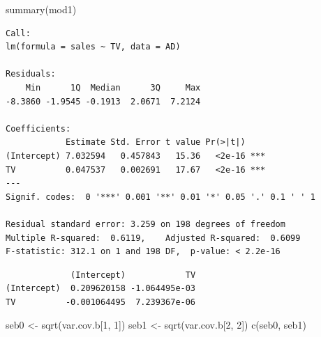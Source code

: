 \documentclass[
]{article}
\newenvironment{Shaded}{\begin{snugshade}}{\end{snugshade}}
\newcommand{\DecValTok}[1]{\textcolor[rgb]{0.00,0.00,0.81}{#1}}
\newcommand{\FunctionTok}[1]{\textcolor[rgb]{0.00,0.00,0.00}{#1}}
\newcommand{\NormalTok}[1]{#1}
\newcommand{\OtherTok}[1]{\textcolor[rgb]{0.56,0.35,0.01}{#1}}
\newcommand{\SpecialCharTok}[1]{\textcolor[rgb]{0.00,0.00,0.00}{#1}}
\begin{document}
\begin{Shaded}
\begin{Highlighting}[]
\FunctionTok{summary}\NormalTok{(mod1)}
\end{Highlighting}
\end{Shaded}

\begin{verbatim}
Call:
lm(formula = sales ~ TV, data = AD)

Residuals:
    Min      1Q  Median      3Q     Max 
-8.3860 -1.9545 -0.1913  2.0671  7.2124 

Coefficients:
            Estimate Std. Error t value Pr(>|t|)    
(Intercept) 7.032594   0.457843   15.36   <2e-16 ***
TV          0.047537   0.002691   17.67   <2e-16 ***
---
Signif. codes:  0 '***' 0.001 '**' 0.01 '*' 0.05 '.' 0.1 ' ' 1

Residual standard error: 3.259 on 198 degrees of freedom
Multiple R-squared:  0.6119,    Adjusted R-squared:  0.6099 
F-statistic: 312.1 on 1 and 198 DF,  p-value: < 2.2e-16
\end{verbatim}

\begin{Shaded}
\end{Shaded}

\begin{verbatim}
             (Intercept)            TV
(Intercept)  0.209620158 -1.064495e-03
TV          -0.001064495  7.239367e-06
\end{verbatim}

\begin{Shaded}
\begin{Highlighting}[]
\NormalTok{seb0 }\OtherTok{\textless{}{-}} \FunctionTok{sqrt}\NormalTok{(var.cov.b[}\DecValTok{1}\NormalTok{, }\DecValTok{1}\NormalTok{])}
\NormalTok{seb1 }\OtherTok{\textless{}{-}} \FunctionTok{sqrt}\NormalTok{(var.cov.b[}\DecValTok{2}\NormalTok{, }\DecValTok{2}\NormalTok{])}
\FunctionTok{c}\NormalTok{(seb0, seb1)}
\end{Highlighting}
\end{Shaded}
\end{document}
